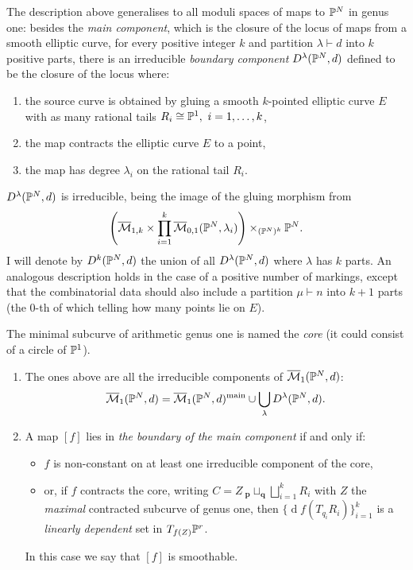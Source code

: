 The description above generalises to all moduli spaces of maps to $\mathbb P^N$ in genus one:
besides the \emph{main component}, which is the closure of the locus of maps from a smooth elliptic curve, for every positive integer $k$ and partition $\lambda\vdash d$ into $k$ positive parts, there is an irreducible \emph{boundary component} $D^{\lambda}(\mathbb P^N,d)$ defined to be the closure of the locus where:
\begin{enumerate}[label=(\roman*)]
\item the source curve is obtained by gluing a smooth $k$-pointed elliptic curve $E$ with as many rational tails $R_i\cong\PP^1,\ i=1,\ldots,k$,
\item the map contracts the elliptic curve $E$ to a point, 
\item the map has degree $\lambda_i$ on the rational tail $R_i$.
\end{enumerate}
$D^{\lambda}(\mathbb P^N,d)$ is irreducible, being the image of the gluing morphism from
\[\left(\overline{\mathcal{M}}_{1,k}\times\prod_{i=1}^k\overline{\mathcal{M}}_{0,1}(\mathbb P^N,\lambda_i)\right)\times_{(\mathbb P^N)^k}\mathbb P^N.\]
I will denote by $D^k(\mathbb P^N,d)$ the union of all $D^{\lambda}(\mathbb P^N,d)$ where $\lambda$ has $k$ parts. An analogous description holds in the case of a positive number of markings, except that the combinatorial data should also include a partition $\mu\vdash n$ into $k+1$ parts (the $0$-th of which telling how many points lie on $E$).

\begin{prop}\label{prop:components} The minimal subcurve of arithmetic genus one is named the \emph{core} (it could consist of a circle of $\mathbb P^1$).
\begin{enumerate}
 \item The ones above are all the irreducible components of $\overline{\mathcal{M}}_1(\mathbb P^N,d)$: 
\[\overline{\mathcal{M}}_1(\mathbb P^N,d)=\overline{\mathcal{M}}_1(\mathbb P^N,d)^{\rm{main}}\cup\bigcup_{\lambda}D^{\lambda}(\mathbb P^N,d).\]
\item A map $[f]$ lies in \emph{the boundary of the main component}  if and only if:
\begin{itemize}[leftmargin=0cm]
\item $f$ is non-constant on at least one irreducible component of the core,
\item or, if $f$ contracts the core, writing $C=Z\ {}_{\mathbf p}\!\sqcup_{\mathbf q}\bigsqcup_{i=1}^k R_i$ with $Z$ the \emph{maximal} contracted subcurve of genus one, then $\{\operatorname{d}\!f(T_{q_i}R_i)\}_{i=1}^k$ is a \emph{linearly dependent} set in $T_{f(Z)}\mathbb P^r$.
\end{itemize}
In this case we say that $[f]$ is smoothable.
\end{enumerate}
\end{prop}
 
